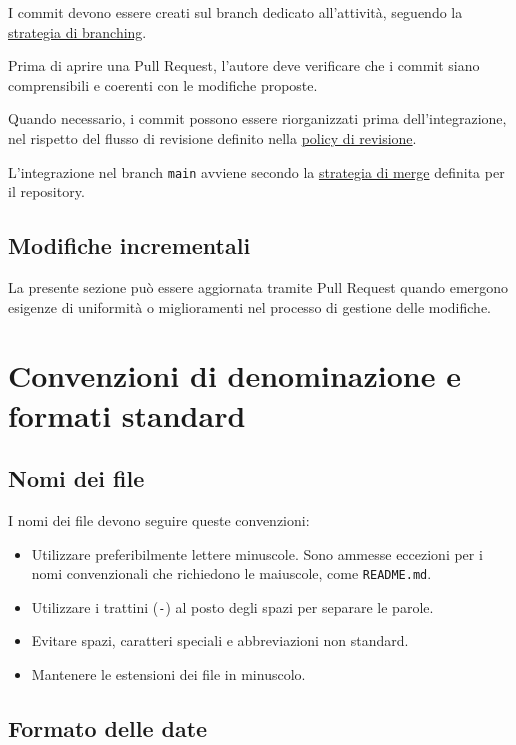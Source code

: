 \documentclass[11pt, a4paper]{article}
\begin{document}
I commit devono essere creati sul branch dedicato all'attività, seguendo la \hyperref[subsec:creazione-dei-branch]{strategia di branching}.

Prima di aprire una Pull Request, l'autore deve verificare che i commit siano comprensibili e coerenti con le modifiche proposte.

Quando necessario, i commit possono essere riorganizzati prima dell'integrazione, nel rispetto del flusso di revisione definito nella \hyperref[subsec:regole-generali]{policy di revisione}.

L'integrazione nel branch \texttt{main} avviene secondo la \hyperref[subsec:pull-request-e-merge]{strategia di merge} definita per il repository.

\subsection{Modifiche incrementali}

La presente sezione può essere aggiornata tramite Pull Request quando emergono esigenze di uniformità o miglioramenti nel processo di gestione delle modifiche.

\section{Convenzioni di denominazione e formati standard}

\subsection{Nomi dei file}

I nomi dei file devono seguire queste convenzioni:
\begin{itemize}
    \item Utilizzare preferibilmente lettere minuscole. Sono ammesse eccezioni per i nomi convenzionali che richiedono le maiuscole, come \texttt{README.md}.
    \item Utilizzare i trattini (\texttt{-}) al posto degli spazi per separare le parole.
    \item Evitare spazi, caratteri speciali e abbreviazioni non standard.
    \item Mantenere le estensioni dei file in minuscolo.
\end{itemize}

\subsection{Formato delle date}
\end{document}
